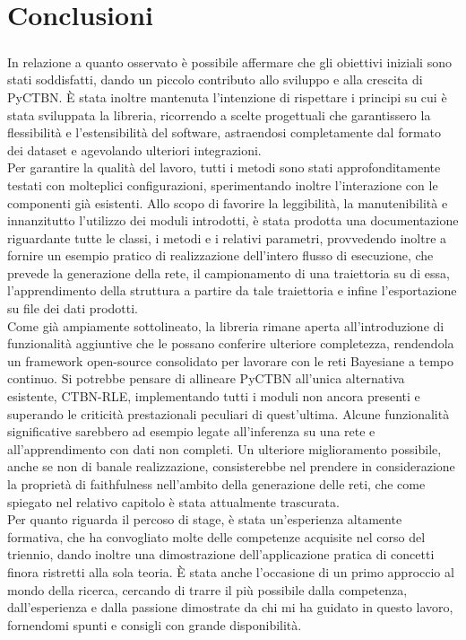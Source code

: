 
  \chapter*{Conclusioni}
  \label{chapter_conclusioni}
  \paragraph{}
  In relazione a quanto osservato è possibile affermare che gli obiettivi iniziali sono
  stati soddisfatti, dando un piccolo contributo allo sviluppo e alla crescita di
  PyCTBN. È stata inoltre mantenuta l'intenzione di rispettare i principi su cui è stata
  sviluppata la libreria, ricorrendo a scelte progettuali che garantissero la flessibilità
  e l'estensibilità del software, astraendosi completamente dal formato dei dataset e
  agevolando ulteriori integrazioni.\\
  Per garantire la qualità del lavoro, tutti i metodi sono stati approfonditamente testati
  con molteplici configurazioni, sperimentando inoltre l'interazione con le componenti già esistenti.
  Allo scopo di favorire la leggibilità, la manutenibilità e innanzitutto l'utilizzo dei
  moduli introdotti, è stata prodotta una documentazione riguardante tutte le classi, i metodi e i 
  relativi parametri, provvedendo inoltre a fornire un esempio pratico di realizzazione dell'intero flusso
  di esecuzione, che prevede la generazione della rete, il campionamento di una traiettoria
  su di essa, l'apprendimento della struttura a partire da tale traiettoria e infine 
  l'esportazione su file dei dati prodotti.\\
  Come già ampiamente sottolineato, la libreria rimane aperta all'introduzione di
  funzionalità aggiuntive che le possano conferire ulteriore completezza, rendendola
  un framework open-source consolidato per lavorare con le reti Bayesiane a tempo continuo.
  Si potrebbe pensare di allineare PyCTBN all'unica alternativa esistente, CTBN-RLE,
  implementando tutti i moduli non ancora presenti e superando le criticità prestazionali peculiari di quest'ultima.
  Alcune funzionalità significative sarebbero ad esempio legate all'inferenza su una rete
  e all'apprendimento con dati non completi.
  Un ulteriore miglioramento possibile, anche se non di banale realizzazione, consisterebbe
  nel prendere in considerazione la proprietà di faithfulness nell'ambito della generazione
  delle reti, che come spiegato nel relativo capitolo è stata attualmente trascurata.\\
  Per quanto riguarda il percoso di stage, è stata un'esperienza altamente formativa,
  che ha convogliato molte delle competenze acquisite nel corso del triennio,
  dando inoltre una dimostrazione dell'applicazione pratica di concetti finora
  ristretti alla sola teoria. È stata anche l'occasione di un primo approccio al 
  mondo della ricerca, cercando di trarre il più possibile dalla competenza, dall'esperienza e dalla
  passione dimostrate da chi mi ha guidato in questo lavoro, fornendomi spunti e
  consigli con grande disponibilità.